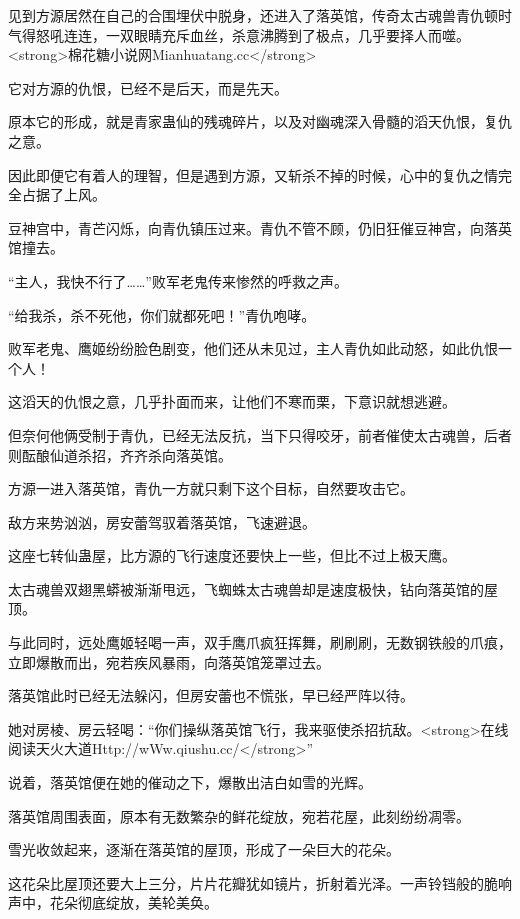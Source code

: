 
\begin{this_body}

见到方源居然在自己的合围埋伏中脱身，还进入了落英馆，传奇太古魂兽青仇顿时气得怒吼连连，一双眼睛充斥血丝，杀意沸腾到了极点，几乎要择人而噬。<strong>棉花糖小说网Mianhuatang.cc</strong>

它对方源的仇恨，已经不是后天，而是先天。

原本它的形成，就是青家蛊仙的残魂碎片，以及对幽魂深入骨髓的滔天仇恨，复仇之意。

因此即便它有着人的理智，但是遇到方源，又斩杀不掉的时候，心中的复仇之情完全占据了上风。

豆神宫中，青芒闪烁，向青仇镇压过来。青仇不管不顾，仍旧狂催豆神宫，向落英馆撞去。

“主人，我快不行了……”败军老鬼传来惨然的呼救之声。

“给我杀，杀不死他，你们就都死吧！”青仇咆哮。

败军老鬼、鹰姬纷纷脸色剧变，他们还从未见过，主人青仇如此动怒，如此仇恨一个人！

这滔天的仇恨之意，几乎扑面而来，让他们不寒而栗，下意识就想逃避。

但奈何他俩受制于青仇，已经无法反抗，当下只得咬牙，前者催使太古魂兽，后者则酝酿仙道杀招，齐齐杀向落英馆。

方源一进入落英馆，青仇一方就只剩下这个目标，自然要攻击它。

敌方来势汹汹，房安蕾驾驭着落英馆，飞速避退。

这座七转仙蛊屋，比方源的飞行速度还要快上一些，但比不过上极天鹰。

太古魂兽双翅黑蟒被渐渐甩远，飞蜘蛛太古魂兽却是速度极快，钻向落英馆的屋顶。

与此同时，远处鹰姬轻喝一声，双手鹰爪疯狂挥舞，刷刷刷，无数钢铁般的爪痕，立即爆散而出，宛若疾风暴雨，向落英馆笼罩过去。

落英馆此时已经无法躲闪，但房安蕾也不慌张，早已经严阵以待。

她对房棱、房云轻喝：“你们操纵落英馆飞行，我来驱使杀招抗敌。<strong>在线阅读天火大道Http://wWw.qiushu.cc/</strong>”

说着，落英馆便在她的催动之下，爆散出洁白如雪的光辉。

落英馆周围表面，原本有无数繁杂的鲜花绽放，宛若花屋，此刻纷纷凋零。

雪光收敛起来，逐渐在落英馆的屋顶，形成了一朵巨大的花朵。

这花朵比屋顶还要大上三分，片片花瓣犹如镜片，折射着光泽。一声铃铛般的脆响声中，花朵彻底绽放，美轮美奂。


\end{this_body}
